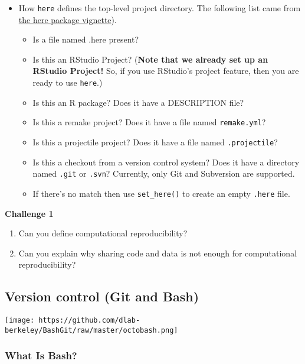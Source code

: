 \documentclass[
]{book}
\providecommand{\tightlist}{%
  \setlength{\itemsep}{0pt}\setlength{\parskip}{0pt}}
\begin{document}
\begin{itemize}
\item
  How \texttt{here} defines the top-level project directory. The following list came from \href{https://github.com/jennybc/here_here}{the here package vignette}).

  \begin{itemize}
  \item
    Is a file named .here present?
  \item
    Is this an RStudio Project? (\textbf{Note that we already set up an RStudio Project!} So, if you use RStudio's project feature, then you are ready to use \texttt{here}.)
  \item
    Is this an R package? Does it have a DESCRIPTION file?
  \item
    Is this a remake project? Does it have a file named \texttt{remake.yml}?
  \item
    Is this a projectile project? Does it have a file named \texttt{.projectile}?
  \item
    Is this a checkout from a version control system? Does it have a directory named \texttt{.git} or \texttt{.svn}? Currently, only Git and Subversion are supported.
  \item
    If there's no match then use \texttt{set\_here()} to create an empty \texttt{.here} file.
  \end{itemize}
\end{itemize}

\textbf{Challenge 1}

\begin{enumerate}
\def\labelenumi{\arabic{enumi}.}
\tightlist
\item
  Can you define computational reproducibility?
\item
  Can you explain why sharing code and data is not enough for computational reproducibility?
\end{enumerate}

\hypertarget{version-control-git-and-bash}{%
\subsection{Version control (Git and Bash)}\label{version-control-git-and-bash}}

\texttt{[image: https://github.com/dlab-berkeley/BashGit/raw/master/octobash.png]}

\hypertarget{what-is-bash}{%
\subsubsection{What Is Bash?}\label{what-is-bash}}
\end{document}
